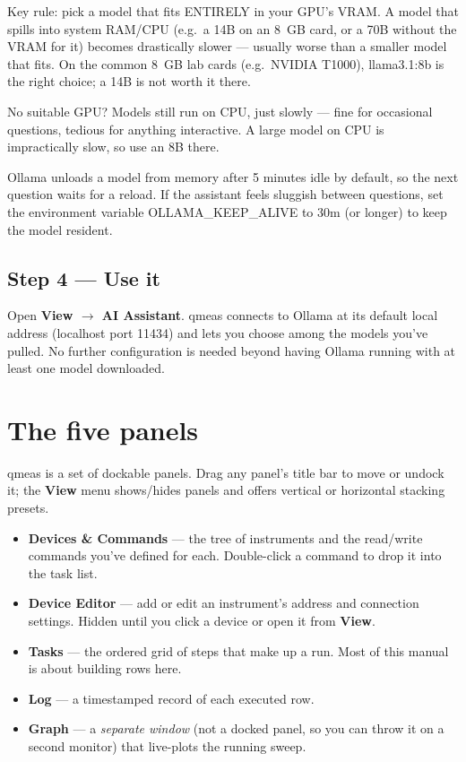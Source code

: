 \documentclass[11pt,a4paper]{article}
\newcommand{\code}[1]{{\ttfamily\color{qcode}#1}}
\begin{document}
Key rule: pick a model that fits ENTIRELY in your GPU's VRAM. A model that
spills into system RAM/CPU (e.g.\ a 14B on an 8~GB card, or a 70B without the
VRAM for it) becomes drastically slower --- usually worse than a smaller model
that fits. On the common 8~GB lab cards (e.g.\ NVIDIA T1000), \code{llama3.1:8b}
is the right choice; a 14B is not worth it there.

No suitable GPU? Models still run on CPU, just slowly --- fine for occasional
questions, tedious for anything interactive. A large model on CPU is
impractically slow, so use an 8B there.

\begin{tip}
Ollama unloads a model from memory after 5 minutes idle by default, so the
next question waits for a reload. If the assistant feels sluggish between
questions, set the environment variable \code{OLLAMA\_KEEP\_ALIVE} to
\code{30m} (or longer) to keep the model resident.
\end{tip}

\subsection{Step 4 --- Use it}

Open \textbf{View $\rightarrow$ AI Assistant}. qmeas connects to Ollama at
its default local address (\code{localhost} port \code{11434}) and lets you
choose among the models you've pulled. No further configuration is needed
beyond having Ollama running with at least one model downloaded.



\section{The five panels}

qmeas is a set of dockable panels. Drag any panel's title bar to move or
undock it; the \textbf{View} menu shows/hides panels and offers vertical or
horizontal stacking presets.

\begin{itemize}
  \item \textbf{Devices \& Commands} --- the tree of instruments and the
  read/write commands you've defined for each. Double-click a command to
  drop it into the task list.
  \item \textbf{Device Editor} --- add or edit an instrument's address and
  connection settings. Hidden until you click a device or open it from
  \textbf{View}.
  \item \textbf{Tasks} --- the ordered grid of steps that make up a run.
  Most of this manual is about building rows here.
  \item \textbf{Log} --- a timestamped record of each executed row.
  \item \textbf{Graph} --- a \emph{separate window} (not a docked panel, so
  you can throw it on a second monitor) that live-plots the running sweep.
\end{itemize}
\end{document}
